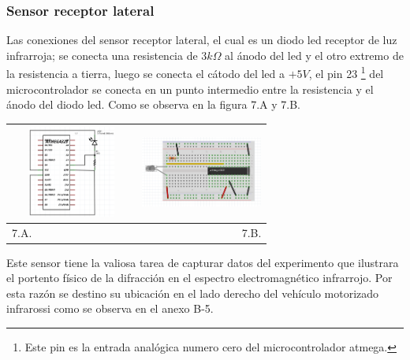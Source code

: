 \documentclass[12]{article}
\newenvironment{Figure}
{\par\medskip\noindent\minipage{\linewidth}}
{\endminipage\par\medskip}
\begin{document}
\begin{multicols}{2}
\subsubsection{Sensor receptor lateral}
Las conexiones del sensor receptor lateral, el cual es un diodo led receptor de luz infrarroja; se conecta una resistencia de $3 k\Omega$ al ánodo del led y el otro extremo de la resistencia a tierra, luego se conecta el cátodo del led a $+5V$, el pin 23 \footnote{Este pin es la entrada analógica numero cero del microcontrolador atmega.} del microcontrolador se conecta  en un punto intermedio entre la resistencia y el ánodo del diodo led. Como se observa en la figura 7.A y 7.B.
\begin{Figure}
\center
\begin{tabular}{|l|r|}
\hline
\includegraphics[width=4cm, height=3cm]{img/senlaesq.png} & \includegraphics[width=4cm, height=3cm]{img/senlapro.png} \\ \hline
7.A. & 7.B. \\ \hline
\end{tabular}
\label{fig:g7}
\end{Figure}
Este sensor tiene la valiosa tarea de capturar datos del experimento que ilustrara el portento físico de la difracción en el espectro electromagnético infrarrojo. Por esta razón se destino su ubicación en el lado derecho del vehículo motorizado infrarossi como se observa en el anexo B-5.

\end{multicols}
\end{document}
